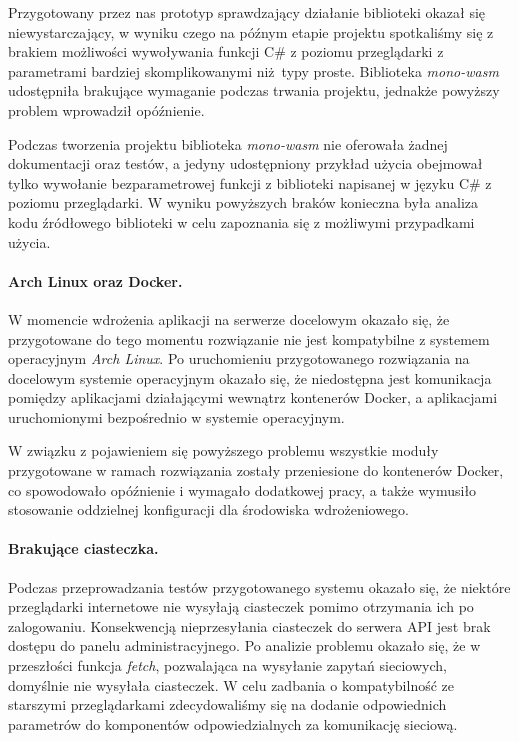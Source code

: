 \documentclass[a4paper,11pt,twoside]{report}
\theoremstyle{definition}
\begin{document}
            Przygotowany przez nas prototyp sprawdzający działanie biblioteki okazał się niewystarczający, w wyniku czego na późnym etapie projektu spotkaliśmy się z brakiem możliwości wywoływania funkcji C\# z poziomu przeglądarki z parametrami bardziej skomplikowanymi niż typy proste. Biblioteka \textit{mono-wasm} udostępniła brakujące wymaganie podczas trwania projektu, jednakże powyższy problem wprowadził opóźnienie.
            
            Podczas tworzenia projektu biblioteka \textit{mono-wasm} nie oferowała żadnej dokumentacji oraz testów, a jedyny udostępniony przykład użycia obejmował tylko wywołanie bezparametrowej funkcji z biblioteki napisanej w języku C\# z poziomu przeglądarki. W wyniku powyższych braków konieczna była analiza kodu źródłowego biblioteki w celu zapoznania się z możliwymi przypadkami użycia.
        
        \paragraph{Arch Linux oraz Docker.}
            W momencie wdrożenia aplikacji na serwerze docelowym okazało się, że przygotowane do tego momentu rozwiązanie nie jest kompatybilne z systemem operacyjnym \textit{Arch Linux}. Po uruchomieniu przygotowanego rozwiązania na docelowym systemie operacyjnym okazało się, że niedostępna jest komunikacja pomiędzy aplikacjami działającymi wewnątrz kontenerów Docker, a aplikacjami uruchomionymi bezpośrednio w systemie operacyjnym.
            
            W związku z pojawieniem się powyższego problemu wszystkie moduły przygotowane w ramach rozwiązania zostały przeniesione do kontenerów Docker, co spowodowało opóźnienie i wymagało dodatkowej pracy, a także wymusiło stosowanie oddzielnej konfiguracji dla środowiska wdrożeniowego.
            
        \paragraph{Brakujące ciasteczka.}
            Podczas przeprowadzania testów przygotowanego systemu okazało się, że niektóre przeglądarki internetowe nie wysyłają ciasteczek pomimo otrzymania ich po zalogowaniu.
            Konsekwencją nieprzesyłania ciasteczek do serwera API jest brak dostępu do panelu administracyjnego. Po analizie problemu okazało się, że w przeszłości funkcja \textit{fetch}, pozwalająca na wysyłanie zapytań sieciowych, domyślnie nie wysyłała ciasteczek. W celu zadbania o kompatybilność ze starszymi przeglądarkami zdecydowaliśmy się na dodanie odpowiednich parametrów do komponentów odpowiedzialnych za komunikację sieciową.
    
\end{document}
